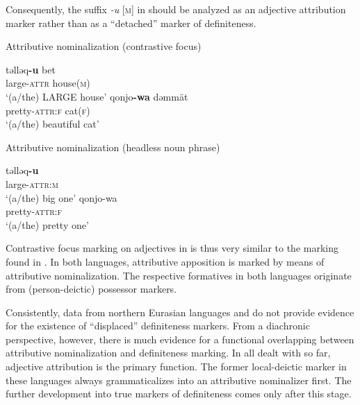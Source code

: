 {Consequently, the suffix \textit{-u} [\textsc{m}] in  should be analyzed as an adjective attribution marker rather than as a “detached” marker of definiteness. 
\begin{exe}
\ex	{}
\begin{xlist}
\ex	\rm{Attributive nominalization (contrastive focus)}
\begin{xlist}
\ex
\gll	təlləq\textbf{-u} bet\\
	large-\textsc{attr} house(\textsc{m})\\
\glt	‘(a/the) LARGE house’
\ex	
\gll	qonjo\textbf{-wa} dəmmät\\
	pretty-\textsc{attr:f} cat(\textsc{f})\\
\glt	‘(a/the) beautiful cat’
\end{xlist}
\ex	\rm{Attributive nominalization (headless noun phrase)}
\begin{xlist}
\ex
\gll	təlləq\textbf{-u}\\
	large-\textsc{attr:m}\\
\glt	‘(a/the) big one’
\ex	
\gll	qonjo-wa\\
	pretty-\textsc{attr:f}\\
\glt	‘(a/the) pretty one’
\end{xlist}
\end{xlist}
\end{exe}
Contrastive focus marking on adjectives in  is thus very similar to the marking found in . In both languages, attributive apposition is marked by means of attributive nominalization. The respective formatives in both languages originate from (person-deictic) possessor markers.

Consistently, data from northern Eurasian languages and  do not provide evidence for the existence of “displaced” definiteness markers. From a diachronic perspective, however, there is much evidence for a functional overlapping between attributive nominalization and definiteness marking. In all  dealt with so far, adjective attribution is the primary function. The former local-deictic marker in these languages always grammaticalizes into an attributive nominalizer first. The further development into true markers of definiteness comes only after this stage.

}
